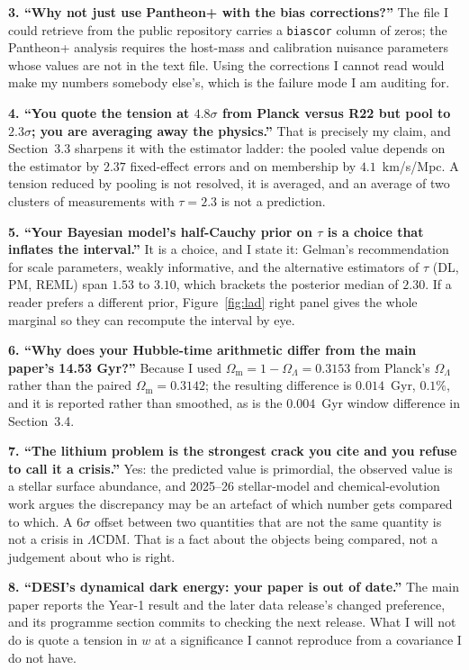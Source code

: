 \documentclass[11pt]{article}
\begin{document}
\textbf{3. ``Why not just use Pantheon+ with the bias corrections?''} The file I could retrieve from the
public repository carries a \texttt{biascor} column of zeros; the Pantheon+ analysis requires the
host-mass and calibration nuisance parameters whose values are not in the text file. Using the
corrections I cannot read would make my numbers somebody else's, which is the failure mode I am
auditing for.

\textbf{4. ``You quote the tension at $4.8\sigma$ from Planck versus R22 but pool to $2.3\sigma$;
you are averaging away the physics.''} That is precisely my claim, and Section~3.3 sharpens it with the
estimator ladder: the pooled value depends on the estimator by $2.37$ fixed-effect errors and on
membership by $4.1$~km/s/Mpc. A tension reduced by pooling is not resolved, it is averaged, and an
average of two clusters of measurements with $\tau=2.3$ is not a prediction.

\textbf{5. ``Your Bayesian model's half-Cauchy prior on $\tau$ is a choice that inflates the interval.''}
It is a choice, and I state it: Gelman's recommendation for scale parameters, weakly informative, and
the alternative estimators of $\tau$ (DL, PM, REML) span $1.53$ to $3.10$, which brackets the posterior
median of $2.30$. If a reader prefers a different prior, Figure~\ref{fig:lad} right panel gives the
whole marginal so they can recompute the interval by eye.

\textbf{6. ``Why does your Hubble-time arithmetic differ from the main paper's 14.53 Gyr?''} Because I
used $\Omega_{\text{m}}=1-\Omega_\Lambda=0.3153$ from Planck's $\Omega_\Lambda$ rather than the paired
$\Omega_{\text{m}}=0.3142$; the resulting difference is $0.014$~Gyr, $0.1\%$, and it is reported rather
than smoothed, as is the $0.004$~Gyr window difference in Section~3.4.

\textbf{7. ``The lithium problem is the strongest crack you cite and you refuse to call it a crisis.''}
Yes: the predicted value is primordial, the observed value is a stellar surface abundance, and
2025--26 stellar-model and chemical-evolution work argues the discrepancy may be an artefact of which
number gets compared to which. A $6\sigma$ offset between two quantities that are not the same
quantity is not a crisis in $\Lambda$CDM. That is a fact about the objects being compared, not a
judgement about who is right.

\textbf{8. ``DESI's dynamical dark energy: your paper is out of date.''} The main paper reports the
Year-1 result and the later data release's changed preference, and its programme section commits to
checking the next release. What I will not do is quote a tension in $w$ at a significance I cannot
reproduce from a covariance I do not have.
\end{document}
